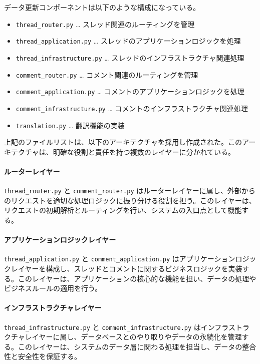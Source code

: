 \documentclass[b5paper,12pt]{jsreport}
\begin{document}
データ更新コンポーネントは以下のような構成になっている。

\begin{itemize}
    \item \texttt{thread\_router.py} … スレッド関連のルーティングを管理
    \item \texttt{thread\_application.py} … スレッドのアプリケーションロジックを処理
    \item \texttt{thread\_infrastructure.py} … スレッドのインフラストラクチャ関連処理
    \item \texttt{comment\_router.py} … コメント関連のルーティングを管理
    \item \texttt{comment\_application.py} … コメントのアプリケーションロジックを処理
    \item \texttt{comment\_infrastructure.py} … コメントのインフラストラクチャ関連処理
    \item \texttt{translation.py} … 翻訳機能の実装
\end{itemize}

上記のファイルリストは、以下のアーキテクチャを採用し作成された。このアーキテクチャは、明確な役割と責任を持つ複数のレイヤーに分かれている。

\paragraph{ルーターレイヤー}
\texttt{thread\_router.py} と \texttt{comment\_router.py} はルーターレイヤーに属し、外部からのリクエストを適切な処理ロジックに振り分ける役割を担う。このレイヤーは、リクエストの初期解析とルーティングを行い、システムの入口点として機能する。

\paragraph{アプリケーションロジックレイヤー}
\texttt{thread\_application.py} と \texttt{comment\_application.py} はアプリケーションロジックレイヤーを構成し、スレッドとコメントに関するビジネスロジックを実装する。このレイヤーは、アプリケーションの核心的な機能を担い、データの処理やビジネスルールの適用を行う。

\paragraph{インフラストラクチャレイヤー}
\texttt{thread\_infrastructure.py} と \texttt{comment\_infrastructure.py} はインフラストラクチャレイヤーに属し、データベースとのやり取りやデータの永続化を管理する。このレイヤーは、システムのデータ層に関わる処理を担当し、データの整合性と安全性を保証する。
\end{document}
